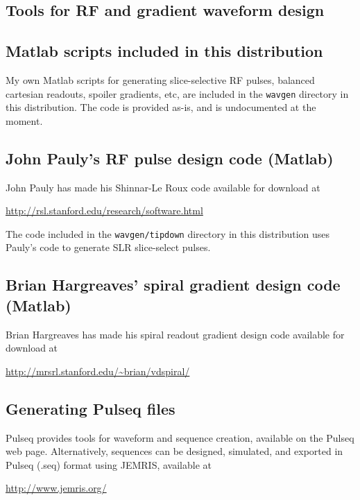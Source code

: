
\begin{appendices}
\chapter{Tools for RF and gradient waveform design}
\label{app:design}

\section{Matlab scripts included in this distribution}
My own Matlab scripts for generating slice-selective RF pulses, balanced cartesian readouts, spoiler gradients, etc, are included in the \texttt{wavgen} directory in this distribution.
The code is provided as-is, and is undocumented at the moment. 


\section{John Pauly's RF pulse design code (Matlab)}
John Pauly has made his Shinnar-Le Roux code available for download at

\url{http://rsl.stanford.edu/research/software.html}

The code included in the \texttt{wavgen/tipdown} directory in this distribution uses Pauly's code to generate SLR slice-select pulses.


\section{Brian Hargreaves' spiral gradient design code (Matlab)}
Brian Hargreaves has made his spiral readout gradient design code available for download at

\url{http://mrsrl.stanford.edu/~brian/vdspiral/}


\section{Generating Pulseq files}

Pulseq provides tools for waveform and sequence creation, available on the Pulseq web page.
Alternatively, sequences can be designed, simulated, and exported in Pulseq (.seq) format using JEMRIS, available at

\url{http://www.jemris.org/}


\end{appendices}
